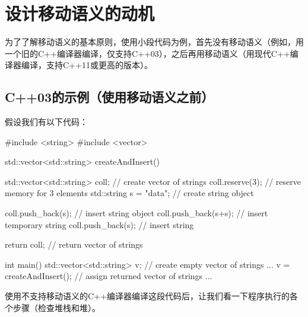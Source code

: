 \section{设计移动语义的动机}
为了了解移动语义的基本原则，使用小段代码为例，首先没有移动语义（例如，用一个旧的C++编译器编译，仅支持C++03），之后再用移动语义（用现代C++编译器编译，支持C++11或更高的版本）。

\subsection{C++03的示例（使用移动语义之前）}

假设我们有以下代码：

\begin{cppcode}
#include <string>
#include <vector>

std::vector<std::string> createAndInsert()
{
	std::vector<std::string> coll; // create vector of strings
	coll.reserve(3); // reserve memory for 3 elements
	std::string s = "data"; // create string object

	coll.push_back(s); // insert string object
	coll.push_back(s+s); // insert temporary string
	coll.push_back(s); // insert string

	return coll; // return vector of strings
}

int main()
{
	std::vector<std::string> v; // create empty vector of strings
	...
	v = createAndInsert(); // assign returned vector of strings
	...
}
\end{cppcode}

使用不支持移动语义的C++编译器编译这段代码后，让我们看一下程序执行的各个步骤（检查堆栈和堆）。

